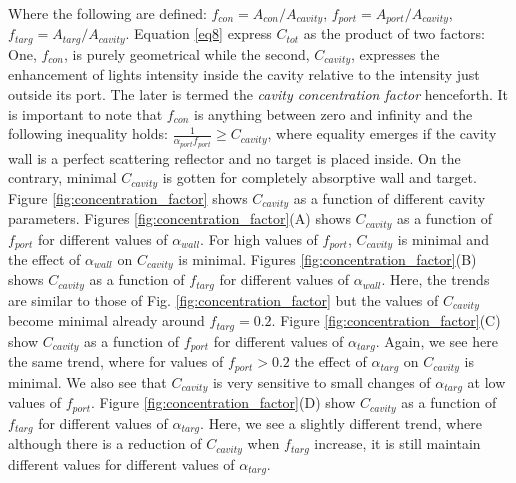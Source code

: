 \documentclass[a4paper]{article}
\begin{document}
\noindent Where the following are defined: $f_{con}=A_{con}/A_{cavity}$, $f_{port}=A_{port}/A_{cavity}$, $f_{targ}=A_{targ}/A_{cavity}$. Equation \ref{eq8} express $C_{tot}$ as the product of two factors: One, $f_{con}$, is purely geometrical while the  second, $C_{cavity}$, expresses the enhancement of lights intensity inside the cavity relative to the intensity just outside its port. The later is termed the \emph{cavity concentration factor} henceforth. It is important to note that $f_{con}$ is anything between zero and infinity and the following inequality holds: $\frac{1}{\alpha_{port}f_{port}}\geq C_{cavity}$, where equality emerges if the cavity wall is a perfect scattering reflector and no target is placed inside. On the contrary, minimal $C_{cavity}$ is gotten for completely absorptive wall and target. Figure \ref{fig:concentration_factor} shows $C_{cavity}$ as a function of different cavity parameters. Figures \ref{fig:concentration_factor}(A) shows $C_{cavity}$ as a function of $f_{port}$ for different values of $\alpha_{wall}$. For high values of $f_{port}$, $C_{cavity}$ is minimal and the effect of $\alpha_{wall}$ on $C_{cavity}$ is minimal. Figures \ref{fig:concentration_factor}(B) shows $C_{cavity}$ as a function of $f_{targ}$ for different values of $\alpha_{wall}$. Here, the trends are similar to those of Fig. \ref{fig:concentration_factor} but the values of $C_{cavity}$ become minimal already around $f_{targ}=0.2$. Figure \ref{fig:concentration_factor}(C) show $C_{cavity}$ as a function of $f_{port}$ for different values of $\alpha_{targ}$. Again, we see here the same trend, where for values of $f_{port}>0.2$ the effect of $\alpha_{targ}$ on $C_{cavity}$ is minimal. We also see that $C_{cavity}$ is very sensitive to small changes of $\alpha_{targ}$ at low values of $f_{port}$. Figure \ref{fig:concentration_factor}(D) show $C_{cavity}$ as a function of $f_{targ}$ for different values of $\alpha_{targ}$. Here, we see a slightly different trend, where although there is a reduction of $C_{cavity}$ when $f_{targ}$ increase, it is still maintain different values for different values of $\alpha_{targ}$. 
\end{document}
